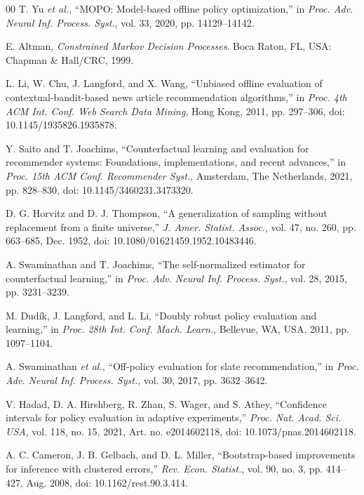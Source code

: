 \documentclass{ieeeaccess}
\begin{document}
\begin{thebibliography}{00}
 T. Yu \emph{et al.}, ``MOPO: Model-based offline policy optimization,'' in \emph{Proc. Adv. Neural Inf. Process. Syst.}, vol. 33, 2020, pp. 14129--14142.

 E. Altman, \emph{Constrained Markov Decision Processes}. Boca Raton, FL, USA: Chapman \& Hall/CRC, 1999.

 L. Li, W. Chu, J. Langford, and X. Wang, ``Unbiased offline evaluation of contextual-bandit-based news article recommendation algorithms,'' in \emph{Proc. 4th ACM Int. Conf. Web Search Data Mining}, Hong Kong, 2011, pp. 297--306, doi: 10.1145/1935826.1935878.

 Y. Saito and T. Joachims, ``Counterfactual learning and evaluation for recommender systems: Foundations, implementations, and recent advances,'' in \emph{Proc. 15th ACM Conf. Recommender Syst.}, Amsterdam, The Netherlands, 2021, pp. 828--830, doi: 10.1145/3460231.3473320.

 D. G. Horvitz and D. J. Thompson, ``A generalization of sampling without replacement from a finite universe,'' \emph{J. Amer. Statist. Assoc.}, vol. 47, no. 260, pp. 663--685, Dec. 1952, doi: 10.1080/01621459.1952.10483446.

 A. Swaminathan and T. Joachims, ``The self-normalized estimator for counterfactual learning,'' in \emph{Proc. Adv. Neural Inf. Process. Syst.}, vol. 28, 2015, pp. 3231--3239.

 M. Dud\'{i}k, J. Langford, and L. Li, ``Doubly robust policy evaluation and learning,'' in \emph{Proc. 28th Int. Conf. Mach. Learn.}, Bellevue, WA, USA, 2011, pp. 1097--1104.

 A. Swaminathan \emph{et al.}, ``Off-policy evaluation for slate recommendation,'' in \emph{Proc. Adv. Neural Inf. Process. Syst.}, vol. 30, 2017, pp. 3632--3642.

 V. Hadad, D. A. Hirshberg, R. Zhan, S. Wager, and S. Athey, ``Confidence intervals for policy evaluation in adaptive experiments,'' \emph{Proc. Nat. Acad. Sci. USA}, vol. 118, no. 15, 2021, Art. no. e2014602118, doi: 10.1073/pnas.2014602118.

 A. C. Cameron, J. B. Gelbach, and D. L. Miller, ``Bootstrap-based improvements for inference with clustered errors,'' \emph{Rev. Econ. Statist.}, vol. 90, no. 3, pp. 414--427, Aug. 2008, doi: 10.1162/rest.90.3.414.


\end{thebibliography}
\end{document}
